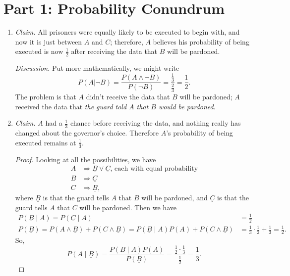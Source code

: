 \documentclass[11pt]{amsart}
\begin{document}
\maketitle

\section*{Part 1: Probability Conundrum}

\begin{enumerate}

\item
\emph{Claim.}  
All prisoners were equally likely to be executed to begin with, and now it is just between $A$ and $C$; therefore, $A$
believes his probability of being executed is now $\frac{1}{2}$ after receiving the data that $B$ will be pardoned.

\emph{Discussion.}
Put more mathematically, we might write
\[
P(A | \neg B) = \frac{P(A \wedge \neg B)}{P(\neg B)} = \frac{\frac{1}{3}}{\frac{2}{3}} = \frac{1}{2}.
\]
The problem is that $A$ didn't receive the data that $B$ will be pardoned; $A$ received the data that \emph{the guard told
$A$ that $B$ would be pardoned}.

\item
\emph{Claim.}
$A$ had a $\frac{1}{3}$ chance before receiving the data, and nothing really has changed about the governor’s choice.
Therefore $A$’s probability of being executed remains at $\frac{1}{3}$.

\begin{proof}
Looking at all the possibilities, we have
\begin{align*}
A &\Rightarrow \underline{B} \vee \underline{C} \text{, each with equal probability}\\
B &\Rightarrow \underline{C} \\
C &\Rightarrow \underline{B},
\end{align*}
where $\underline{B}$ is that the guard tells $A$ that $B$ will be pardoned, and $\underline{C}$ is that the guard tells
$A$ that $C$ will be pardoned.  Then we have
\begin{align*}
P(\underline{B} \mid A) = P(\underline{C} \mid A) &= \frac{1}{2} \\
P(\underline{B}) =
P(A \wedge \underline{B}) + P(C \wedge \underline{B}) =
P(\underline{B} \mid A)P(A) + P(C \wedge \underline{B}) &= \frac{1}{3}\cdot\frac{1}{2} + \frac{1}{3} = \frac{1}{2}.
\end{align*}
So,
\[
P(A \mid \underline{B}) = \frac{P(\underline{B} \mid A)P(A)}{P(\underline{B})} = \frac{\frac{1}{2}\cdot\frac{1}{3}}{\frac{1}{2}} = \frac{1}{3}.
\]
\end{proof}

\end{enumerate}
\end{document}

